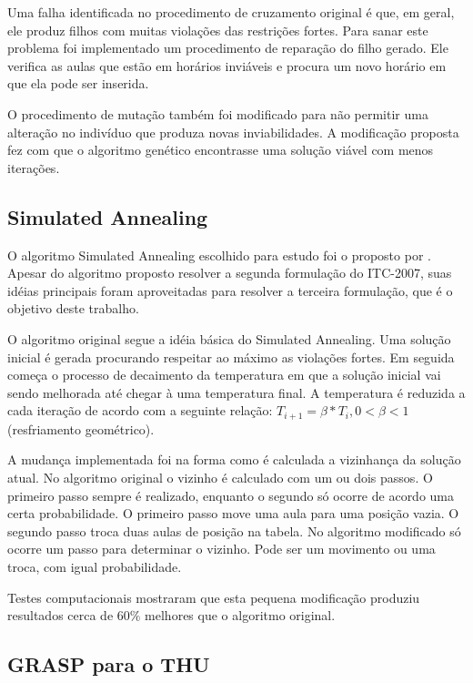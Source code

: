 \documentclass[11pt]{article}
\begin{document}
Uma falha identificada no procedimento de cruzamento original é que, em geral, ele produz filhos com muitas violações das restrições fortes. Para sanar este problema foi implementado um procedimento de reparação do filho gerado. Ele verifica as aulas que estão em horários inviáveis e procura um novo horário em que ela pode ser inserida.

O procedimento de mutação também foi modificado para não permitir uma alteração no indivíduo que produza novas inviabilidades. A modificação proposta fez com que o algoritmo genético encontrasse uma solução viável com menos iterações.

\subsection{Simulated Annealing}

O algoritmo Simulated Annealing escolhido para estudo foi o proposto por \cite{CDGS11b}. Apesar do algoritmo proposto resolver a segunda formulação do ITC-2007, suas idéias principais foram aproveitadas para resolver a terceira formulação, que é o objetivo deste trabalho.

O algoritmo original segue a idéia básica do Simulated Annealing. Uma solução inicial é gerada procurando respeitar ao máximo as violações fortes. Em seguida começa o processo de decaimento da temperatura em que a solução inicial vai sendo melhorada até chegar à uma temperatura final. A temperatura é reduzida a cada iteração de acordo com a seguinte relação: $T_{i+1} = \beta * T_i, 0 < \beta < 1$ (resfriamento geométrico).

A mudança implementada foi na forma como é calculada a vizinhança da solução atual. No algoritmo original o vizinho é calculado com um ou dois passos. O primeiro passo sempre é realizado, enquanto o segundo só ocorre de acordo uma certa probabilidade. O primeiro passo move uma aula para uma posição vazia. O segundo passo troca duas aulas de posição na tabela. No algoritmo modificado só ocorre um passo para determinar o vizinho. Pode ser um movimento ou uma troca, com igual probabilidade.

Testes computacionais mostraram que esta pequena modificação produziu resultados cerca de $60\%$ melhores que o algoritmo original.

\subsection{GRASP para o THU}
\end{document}
